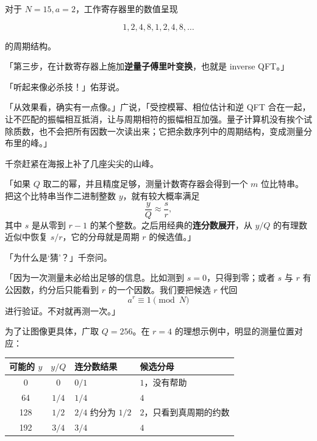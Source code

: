 对于 $N=15,a=2$，工作寄存器里的数值呈现

\begin{equation}
1,2,4,8,1,2,4,8,\ldots
\end{equation}

的周期结构。

「第三步，在计数寄存器上施加\textbf{逆量子傅里叶变换}，也就是 inverse QFT。」

「听起来像必杀技！」佑芽说。

「从效果看，确实有一点像。」广说，「受控模幂、相位估计和逆 QFT 合在一起，让不匹配的振幅相互抵消，让与周期相符的振幅相互加强。量子计算机没有挨个试除质数，也不会把所有因数一次读出来；它把余数序列中的周期结构，变成测量分布里的峰。」\cite{ch07ibmtutorial}

千奈赶紧在海报上补了几座尖尖的山峰。

「如果 $Q$ 取二的幂，并且精度足够，测量计数寄存器会得到一个 $m$ 位比特串。把这个比特串当作二进制整数 $y$，就有较大概率满足
\begin{equation}
\frac{y}{Q}\approx\frac{s}{r},
\end{equation}
其中 $s$ 是从零到 $r-1$ 的某个整数。之后用经典的\textbf{连分数展开}，从 $y/Q$ 的有理数近似中恢复 $s/r$，它的分母就是周期 $r$ 的候选值。」

「为什么是‘猜’？」千奈问。

「因为一次测量未必给出足够的信息。比如测到 $s=0$，只得到零；或者 $s$ 与 $r$ 有公因数，约分后只能看到 $r$ 的一个因数。我们要把候选 $r$ 代回
\begin{equation}
a^r\equiv1\pmod N
\end{equation}
进行验证。不对就再测一次。」

为了让图像更具体，广取 $Q=256$。在 $r=4$ 的理想示例中，明显的测量位置对应：

\begin{center}
\small
\setlength{\tabcolsep}{4pt}
\begin{tabular}{c c L{3.0cm} L{3.8cm}}
\toprule
可能的 $y$ & $y/Q$ & 连分数结果 & 候选分母 \\
   & $0$   & $0/1$               & $1$，没有帮助 \\
64  & $1/4$ & $1/4$               & $4$ \\
128 & $1/2$ & $2/4$ 约分为 $1/2$ & $2$，只看到真周期的约数 \\
192 & $3/4$ & $3/4$               & $4$ \\
\bottomrule
\end{tabular}
\end{center}

